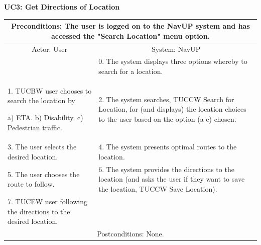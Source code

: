 \documentclass{article}
\begin{document}
		 \vspace{5mm}
         \begin{flushleft}
         \textbf{UC3: Get Directions of Location}\\
         \end{flushleft}
        	\centering		
       		 \small
       		 \begin{tabular}{|p{6cm}|p{6cm}|}
       		 \hline
       		 \multicolumn{2}{c}{ \parbox{12cm}{\vspace{2mm}Preconditions: The user is logged on to the NavUP system and has accessed the "Search Location" menu option.\vspace{2mm}}}\\
       		 \hline
       		 \multicolumn{1}{c}{Actor: User} & \multicolumn{1}{c}{ System: NavUP} \\
        		\hline
       		 & 0.	The system displays three options whereby to search for a location.\\
       		 \hline
       		 1.	TUCBW user chooses to search the location by 

						a)	ETA.
						b)	Disability.
						c)	Pedestrian traffic.
 				& 2.	The system searches, TUCCW Search for Location, for (and displays) the location choices to the user based on the option (a-c) chosen.\\
        		\hline
       		 3.	The user selects the desired location. & 4.	The system presents optimal routes to the location. \\
        		\hline
       		 5.	The user chooses the route to follow. & 6.	The system provides the directions to the location (and asks the user if they want to save the location, TUCCW Save Location).\\
        		\hline
        		7.	TUCEW user following the directions to the desired location. & \\
       		 \hline
        		\multicolumn{2}{c}{Postconditions: None.} \\
        		\hline
        \end{tabular} 
        
\end{document}
